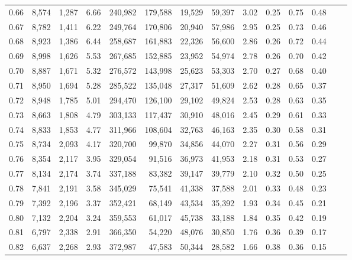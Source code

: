 \begin{tabular}{rrrrrrrrrrrrrr}
0.66 &  8,574 &  1,287 &    6.66 &  240,982 &  179,588 &  19,529 &  59,397 &  3.02 &  0.25 &  0.75 &      0.48 \\
0.67 &  8,782 &  1,411 &    6.22 &  249,764 &  170,806 &  20,940 &  57,986 &  2.95 &  0.25 &  0.73 &      0.46 \\
0.68 &  8,923 &  1,386 &    6.44 &  258,687 &  161,883 &  22,326 &  56,600 &  2.86 &  0.26 &  0.72 &      0.44 \\
0.69 &  8,998 &  1,626 &    5.53 &  267,685 &  152,885 &  23,952 &  54,974 &  2.78 &  0.26 &  0.70 &      0.42 \\
0.70 &  8,887 &  1,671 &    5.32 &  276,572 &  143,998 &  25,623 &  53,303 &  2.70 &  0.27 &  0.68 &      0.40 \\
0.71 &  8,950 &  1,694 &    5.28 &  285,522 &  135,048 &  27,317 &  51,609 &  2.62 &  0.28 &  0.65 &      0.37 \\
0.72 &  8,948 &  1,785 &    5.01 &  294,470 &  126,100 &  29,102 &  49,824 &  2.53 &  0.28 &  0.63 &      0.35 \\
0.73 &  8,663 &  1,808 &    4.79 &  303,133 &  117,437 &  30,910 &  48,016 &  2.45 &  0.29 &  0.61 &      0.33 \\
0.74 &  8,833 &  1,853 &    4.77 &  311,966 &  108,604 &  32,763 &  46,163 &  2.35 &  0.30 &  0.58 &      0.31 \\
0.75 &  8,734 &  2,093 &    4.17 &  320,700 &   99,870 &  34,856 &  44,070 &  2.27 &  0.31 &  0.56 &      0.29 \\
0.76 &  8,354 &  2,117 &    3.95 &  329,054 &   91,516 &  36,973 &  41,953 &  2.18 &  0.31 &  0.53 &      0.27 \\
0.77 &  8,134 &  2,174 &    3.74 &  337,188 &   83,382 &  39,147 &  39,779 &  2.10 &  0.32 &  0.50 &      0.25 \\
0.78 &  7,841 &  2,191 &    3.58 &  345,029 &   75,541 &  41,338 &  37,588 &  2.01 &  0.33 &  0.48 &      0.23 \\
0.79 &  7,392 &  2,196 &    3.37 &  352,421 &   68,149 &  43,534 &  35,392 &  1.93 &  0.34 &  0.45 &      0.21 \\
0.80 &  7,132 &  2,204 &    3.24 &  359,553 &   61,017 &  45,738 &  33,188 &  1.84 &  0.35 &  0.42 &      0.19 \\
0.81 &  6,797 &  2,338 &    2.91 &  366,350 &   54,220 &  48,076 &  30,850 &  1.76 &  0.36 &  0.39 &      0.17 \\
0.82 &  6,637 &  2,268 &    2.93 &  372,987 &   47,583 &  50,344 &  28,582 &  1.66 &  0.38 &  0.36 &      0.15 \\

\end{tabular}
